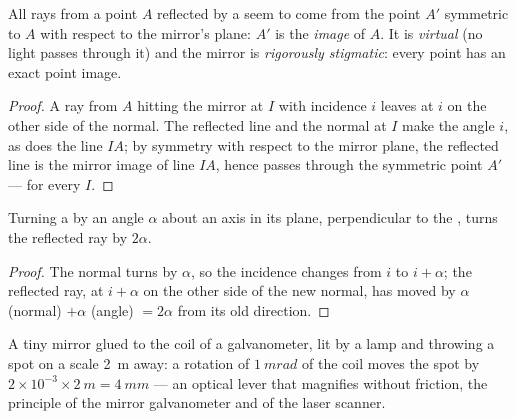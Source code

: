 \begin{proposition}\label{prop:b1:rays-reflection-refraction:mirror}
All rays from a point $A$ reflected by a  seem to come from
the point $A'$ symmetric to $A$ with respect to the mirror's plane: $A'$
is the \emph{image} of $A$. It is \emph{virtual} (no light passes through
it) and the mirror is \emph{rigorously stigmatic}: every point has an
exact point image.
\end{proposition}

\begin{proof}
A ray from $A$ hitting the mirror at $I$ with incidence $i$ leaves at
$i$ on the other side of the normal. The reflected line and the normal
at $I$ make the angle $i$, as does the line $IA$; by symmetry with
respect to the mirror plane, the reflected line is the mirror image of
line $IA$, hence passes through the symmetric point $A'$ --- for every
$I$.
\end{proof}

\begin{proposition}\label{prop:b1:rays-reflection-refraction:rotation}
Turning a  by an angle $\alpha$ about an axis in its plane,
perpendicular to the , turns the reflected ray by
$2\alpha$.
\end{proposition}

\begin{proof}
The normal turns by $\alpha$, so the incidence changes from $i$ to
$i + \alpha$; the reflected ray, at $i + \alpha$ on the other side of
the new normal, has moved by $\alpha$ (normal) $+ \alpha$ (angle) $=
2\alpha$ from its old direction.
\end{proof}

\begin{example}\label{ex:b1:rays-reflection-refraction:galvanometer}
A tiny mirror glued to the coil of a galvanometer, lit by a lamp and
throwing a spot on a scale \qty{2}{m} away: a rotation of
$\qty{1}{mrad}$ of the coil moves the spot by $2 \times 10^{-3} \times
\qty{2}{m} = \qty{4}{mm}$ --- an optical lever that magnifies without
friction, the principle of the mirror galvanometer and of the laser
scanner.
\end{example}

